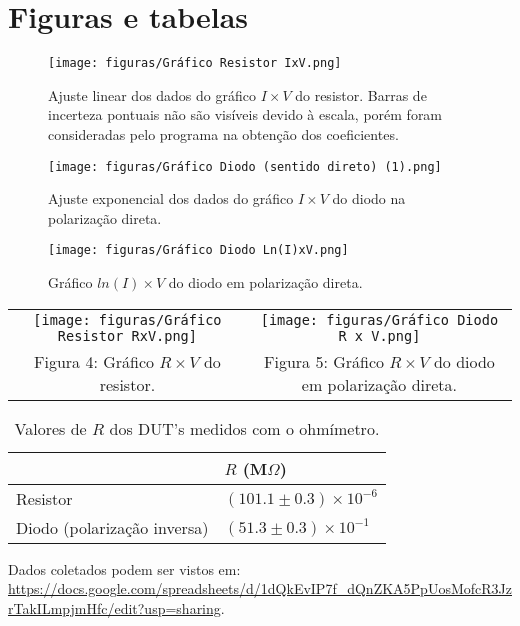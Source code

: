 
\section{Figuras e tabelas}

\begin{figure*}[h]
\centering
\texttt{[image: figuras/Gráfico Resistor IxV.png]}
\caption{\small{Ajuste linear dos dados do gráfico $I\times V$ do resistor. Barras de incerteza pontuais não são visíveis devido à escala, porém foram consideradas pelo programa na obtenção dos coeficientes.}}
\label{fig:1}
\end{figure*}

\begin{figure*}[h]
\centering
\texttt{[image: figuras/Gráfico Diodo (sentido direto) (1).png]}
\caption{\small{Ajuste exponencial dos dados do gráfico $I\times V$ do diodo na polarização direta.}}
\label{fig:4}
\end{figure*}

\begin{figure*}[h]
\centering
\texttt{[image: figuras/Gráfico Diodo Ln(I)xV.png]}
\caption{\small{Gráfico $ln(I)\times V$ do diodo em polarização direta.}}
\label{fig:5}
\end{figure*}

\begin{tabular}{cc}
     \texttt{[image: figuras/Gráfico Resistor RxV.png]}& \texttt{[image: figuras/Gráfico Diodo R x V.png]} \\ \small{Figura 4: Gráfico $R\times V$ do resistor.}
     & \small{Figura 5: Gráfico $R\times V$ do diodo em polarização direta.}
\end{tabular}



\begin{table}[h]
\center
\begin{tabular}{|l|l|}
\hline
 & $R$ (M$\Omega$)\\ \hline
Resistor &$(101.1 \pm 0.3)\times 10^{-6}$ \\ \hline
Diodo (polarização inversa) &$(51.3 \pm 0.3)\times10^{-1}$
\\ \hline
\end{tabular}
\caption{Valores de $R$ dos DUT's medidos com o ohmímetro.}
\label{tab:1}
\end{table}

Dados coletados podem ser vistos em: \url{https://docs.google.com/spreadsheets/d/1dQkEvIP7f_dQnZKA5PpUosMofcR3JzrTakILmpjmHfc/edit?usp=sharing}.

